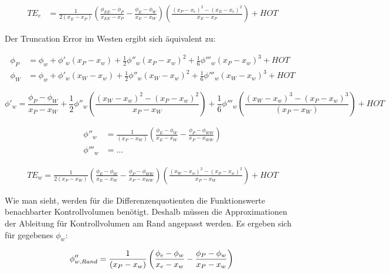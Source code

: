 \documentclass[10pt, ngerman,colorback,accentcolor=tud2d]{tudreport}
\begin{document}
\begin{align*}
  {TE}_e &= \frac{1}{2 (x_E-x_P)}\left({
\frac{\phi_{EE}-\phi_P}{x_{EE}-x_P}-\frac{\phi_E-\phi_W}{x_E-x_W}}\right) \left({\frac{{(x_P-x_e)}^2-{(x_E-x_e)}^2}{x_E-x_P}}\right)+HOT
\end{align*}

Der Truncation Error im Westen ergibt sich äquivalent zu:

\begin{align}
  \phi_P &= \phi_w + \phi'_w(x_P-x_w)+\frac{1}{2}\phi''_w(x_P-x_w)^2
  +\frac{1}{6}\phi'''_w(x_P-x_w)^3+HOT
  \label{eq:taylor_wP}\\
  \phi_W &= \phi_w + \phi'_w(x_W-x_w)+\frac{1}{2}\phi''_w(x_W-x_w)^2
  +\frac{1}{6}\phi'''_w(x_W-x_w)^3+HOT
  \label{eq:taylor_eP}
\end{align}

\begin{equation}
  \phi'_w = \frac{\phi_P-\phi_W}{x_P-x_W}+\frac{1}{2}\phi''_w
\left({\frac{{(x_W-x_w)}^2-{(x_P-x_w)}^2}{x_P-x_W}}\right)+
\frac{1}{6} \phi'''_w \left({\frac{{(x_W-x_w)}^3-{(x_P-x_w)}^3}{(x_P-x_W)}}\right)+HOT
\end{equation}

\begin{align*}
  \phi''_w &= \frac{1}{(x_P-x_W)}\left({
\frac{\phi_{E}-\phi_W}{x_{E}-x_W}-\frac{\phi_P-\phi_{WW}}{x_P-x_{WW}}}\right)\\
 \phi'''_w &= \dots
\end{align*}

\begin{align*}
  TE_w = \frac{1}{2 (x_P-x_W)} \left({
\frac{\phi_{E}-\phi_W}{x_{E}-x_W}-\frac{\phi_P-\phi_{WW}}{x_P-x_{WW}}}\right)
  \left({\frac{{(x_W-x_w)}^2-{(x_P-x_w)}^2}{x_P-x_W}}\right)+HOT
\end{align*}


Wie man sieht, werden für die Differenzenquotienten die Funktionswerte benachbarter
Kontrollvolumen benötigt. Deshalb müssen die Approximationen der Ableitung für
Kontrollvolumen am Rand angepasst werden. Es ergeben sich für gegebenes $\phi_w$:

\begin{equation*}
  \phi''_{w, Rand} = \frac{1}{(x_P-x_w)}\left({
\frac{\phi_{e}-\phi_w}{x_{e}-x_w}-\frac{\phi_P-\phi_w}{x_P-x_w}}\right)\\
\end{equation*}
\end{document}
